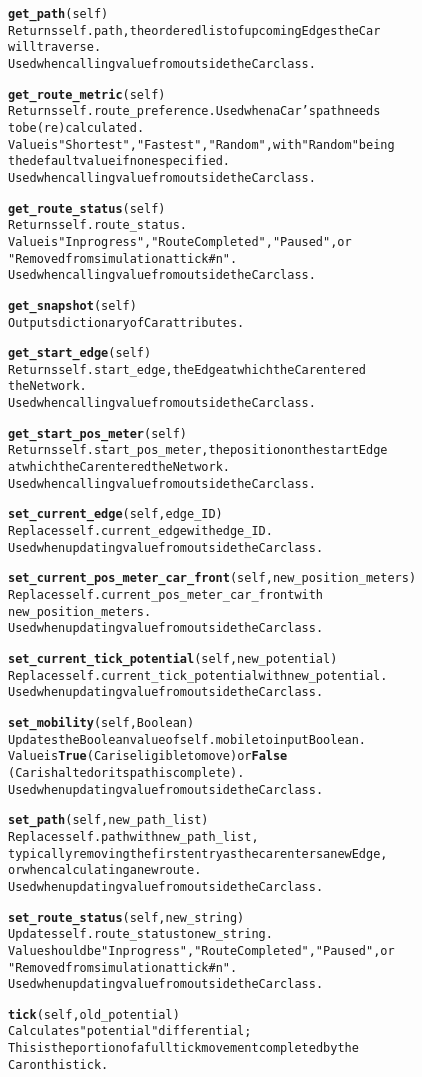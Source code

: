 \begin{alltt}
\textbf{get_path}(self)
Returns self.path, the ordered list of upcoming Edges the Car
will traverse.
Used when calling value from outside the Car class.

\textbf{get_route_metric}(self)
Returns self.route_preference.  Used when a Car's path needs 
to be (re)calculated.
Value is "Shortest", "Fastest", "Random", with "Random" being 
the default value if none specified.
Used when calling value from outside the Car class.

\textbf{get_route_status}(self)
Returns self.route_status.
Value is "In progress", "Route Completed", "Paused", or 
"Removed from simulation at tick #n".
Used when calling value from outside the Car class.

\textbf{get_snapshot}(self)
Outputs dictionary of Car attributes.

\textbf{get_start_edge}(self)
Returns self.start_edge, the Edge at which the Car entered 
the Network.
Used when calling value from outside the Car class.

\textbf{get_start_pos_meter}(self)
Returns self.start_pos_meter, the position on the start Edge 
at which the Car entered the Network.
Used when calling value from outside the Car class.

\textbf{set_current_edge}(self, edge_ID)
Replaces self.current_edge with edge_ID.
Used when updating value from outside the Car class.

\textbf{set_current_pos_meter_car_front}(self, new_position_meters)
Replaces self.current_pos_meter_car_front with 
new_position_meters.
Used when updating value from outside the Car class.

\textbf{set_current_tick_potential}(self, new_potential)
Replaces self.current_tick_potential with new_potential.
Used when updating value from outside the Car class.

\textbf{set_mobility}(self, Boolean)
Updates the Boolean value of self.mobile to input Boolean.
Value is \textbf{True} (Car is eligible to move) or \textbf{False}
(Car is halted or its path is complete).
Used when updating value from outside the Car class.

\textbf{set_path}(self, new_path_list)
Replaces self.path with new_path_list, 
typically removing the first entry as the car enters a new Edge, 
or when calculating a new route.
Used when updating value from outside the Car class.

\textbf{set_route_status}(self, new_string)
Updates self.route_status to new_string.
Value should be "In progress", "Route Completed", "Paused", or 
"Removed from simulation at tick #n".
Used when updating value from outside the Car class.

\textbf{tick}(self, old_potential)
Calculates "potential" differential;
This is the portion of a full tick movement completed by the 
Car on this tick.

\end{alltt}


